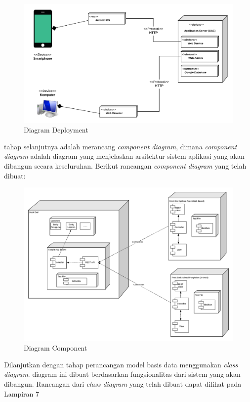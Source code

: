 		\vspace{-0.4cm}
	\begin{figure}[H]
		\center
		\includegraphics [width = 14cm]{gambar/model/deployment}
		\caption{Diagram Deployment}
		\label{deployment}
	\end{figure}

	\par tahap selanjutnya adalah merancang \textit{component diagram}, dimana \textit{component diagram} adalah diagram yang menjelaskan arsitektur sistem aplikasi yang akan dibangun secara keseluruhan. Berikut rancangan \textit{component diagram} yang telah dibuat:
	
	\vspace{-0.4cm}
	\begin{figure}[H]
		\center
		\includegraphics [width = 12cm]{gambar/model/component}
		\caption{Diagram Component}
		\label{component}
	\end{figure}

	\newpage
	\par Dilanjutkan dengan tahap perancangan model basis data menggunakan \textit{class diagram}. diagram ini dibuat berdasarkan fungsionalitas dari sistem yang akan dibangun. Rancangan dari \textit{class diagram} yang telah dibuat dapat dilihat pada Lampiran 7

